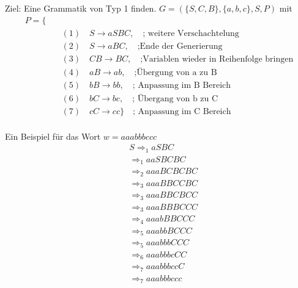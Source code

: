\documentclass{article}
\begin{document}
Ziel: Eine Grammatik von Typ 1 finden.
$G = (\{S, C, B\}, \{a, b, c\}, S, P)$ mit
\begin{equation}
\begin{split}
P = \{ \\\
&\quad (1) \quad S \rightarrow aSBC, \quad \text{; weitere Verschachtelung} \\\ 
&\quad (2) \quad S \rightarrow aBC, \quad \text{;Ende der Generierung} \\\
&\quad (3) \quad CB \rightarrow BC, \quad \text{;Variablen wieder in Reihenfolge bringen} \\\
&\quad (4) \quad aB \rightarrow ab, \quad \text{;Übergung von a zu B} \\\
&\quad (5) \quad bB \rightarrow bb, \quad \text{; Anpassung im B Bereich} \\\
&\quad (6) \quad bC \rightarrow bc, \quad \text{; Übergang von b zu C} \\\
&\quad (7) \quad cC \rightarrow cc \} \quad \text{; Anpassung im C Bereich} \\\
\end{split}
\end{equation}

Ein Beispiel für das Wort $w=aaabbbccc$
\begin{equation}
\begin{split}
&S \Rightarrow_1 aSBC \\\ 
&\Rightarrow_1 aaSBCBC \\\ 
&\Rightarrow_2 aaaBCBCBC \\\ 
&\Rightarrow_3 aaaBBCCBC \\\ 
&\Rightarrow_3 aaaBBCBCC \\\ 
&\Rightarrow_3 aaaBBBCCC \\\ 
&\Rightarrow_4 aaabBBCCC \\\ 
&\Rightarrow_5 aaabbBCCC \\\
&\Rightarrow_5 aaabbbCCC \\\ 
&\Rightarrow_6 aaabbbcCC \\\ 
&\Rightarrow_7 aaabbbccC \\\ 
&\Rightarrow_7 aaabbbccc \\\ 
\end{split}
\end{equation}
\end{document}
